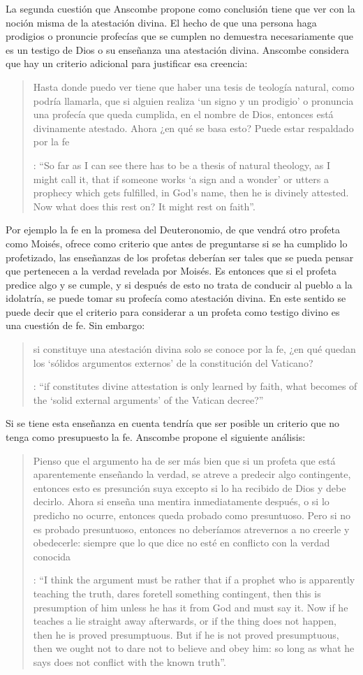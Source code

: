 La segunda cuestión que Anscombe propone como conclusión tiene que ver con la noción misma de la atestación divina. El hecho de que una persona haga prodigios o pronuncie profecías que se cumplen no demuestra necesariamente que es un testigo de Dios o su enseñanza una atestación divina. Anscombe considera que hay un criterio adicional para justificar esa creencia: \blockquote[{\Cite[38]{anscombe2008faith:prophandmi}}: \enquote{So far as I can see there has to be a thesis of natural theology, as I might call it, that if someone works `a sign and a wonder' or utters a prophecy which gets fulfilled, in God's name, then he is divinely attested. Now what does this rest on? It might rest on faith}.]{Hasta donde puedo ver tiene que haber una tesis de teología natural, como podría llamarla, que si alguien realiza `un signo y un prodigio' o pronuncia una profecía que queda cumplida, en el nombre de Dios, entonces está divinamente atestado. Ahora ¿en qué se basa esto? Puede estar respaldado por la fe}. Por ejemplo la fe en la promesa del Deuteronomio, de que vendrá otro profeta como Moisés, ofrece como criterio que antes de preguntarse si se ha cumplido lo profetizado, las enseñanzas de los profetas deberían ser tales que se pueda pensar que pertenecen a la verdad revelada por Moisés. Es entonces que si el profeta predice algo y se cumple, y si después de esto no trata de conducir al pueblo a la idolatría, se puede tomar su profecía como atestación divina. En este sentido se puede decir que el criterio para considerar a un profeta como testigo divino es una cuestión de fe. Sin embargo: \blockquote[{\Cite[38]{anscombe2008faith:prophandmi}}: \enquote{if  constitutes divine attestation is only learned by faith, what becomes of the `solid external arguments' of the Vatican decree?}]{si  constituye una atestación divina solo se conoce por la fe, ¿en qué quedan los `sólidos argumentos externos' de la constitución del Vaticano?}. Si se tiene esta enseñanza en cuenta tendría que ser posible un criterio que no tenga como presupuesto la fe. Anscombe propone el siguiente análisis: \blockquote[{\Cite[38]{anscombe2008faith:prophandmi}}: \enquote{I think the argument must be rather that if a prophet who is apparently teaching the truth, dares foretell something contingent, then this is presumption of him unless he has it from God and must say it. Now if he teaches a lie straight away afterwards, or if the thing does not happen, then he is proved presumptuous. But if he is not proved presumptuous, then we ought not to dare not to believe and obey him: so long as what he says does not conflict with the known truth}.]{Pienso que el argumento ha de ser más bien que si un profeta que está aparentemente enseñando la verdad, se atreve a predecir algo contingente, entonces esto es presunción suya excepto si lo ha recibido de Dios y debe decirlo. Ahora si enseña una mentira inmediatamente después, o si lo predicho no ocurre, entonces queda probado como presuntuoso. Pero si no es probado presuntuoso, entonces no deberíamos atrevernos a no creerle y obedecerle: siempre que lo que dice no esté en conflicto con la verdad conocida}.\label{subsec:argprof}

